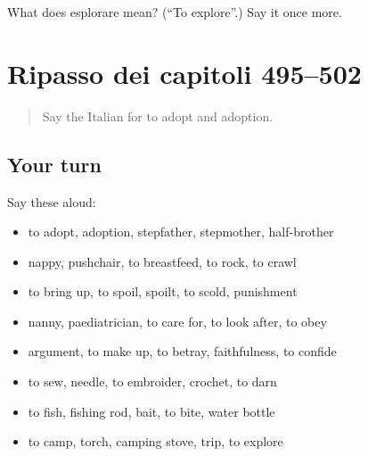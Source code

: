 \begin{tcolorbox}[breakable,colback=teal!4,colframe=teal!35!black,title={Before you move on}]
What does esplorare mean? (\textquotedblleft{}To explore\textquotedblright{}.) Say it once more.
\end{tcolorbox}
\section[(dialogue)]{Ripasso dei capitoli 495–502}

\label{lesson:IT-R502-ripasso-495-502}



\begin{quote}
Say the Italian for to adopt and adoption.
\end{quote}

\subsection*{Your turn}
Say these aloud:

\begin{itemize}
\raggedright
  \item to adopt, adoption, stepfather, stepmother, half-brother
  \item nappy, pushchair, to breastfeed, to rock, to crawl
  \item to bring up, to spoil, spoilt, to scold, punishment
  \item nanny, paediatrician, to care for, to look after, to obey
  \item argument, to make up, to betray, faithfulness, to confide
  \item to sew, needle, to embroider, crochet, to darn
  \item to fish, fishing rod, bait, to bite, water bottle
  \item to camp, torch, camping stove, trip, to explore
\end{itemize}

